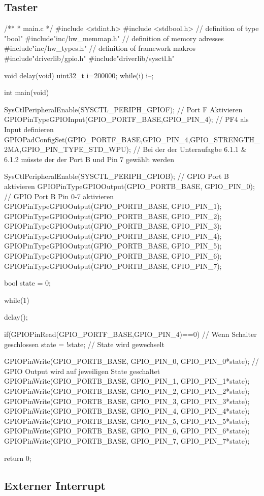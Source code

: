 \subsection{Taster}

/**
 * main.c
 */
 #include <stdint.h>
 #include <stdbool.h>                                           // definition of type "bool"
 #include"inc/hw_memmap.h"                                      // definition of memory adresses
 #include"inc/hw_types.h"                                        // definition of framework makros
 #include"driverlib/gpio.h"
 #include"driverlib/sysctl.h"

void delay(void)
{
  uint32_t i=200000;
  while(i) {i--;}
 }


int main(void){

    SysCtlPeripheralEnable(SYSCTL_PERIPH_GPIOF);                // Port F Aktivieren
    GPIOPinTypeGPIOInput(GPIO_PORTF_BASE,GPIO_PIN_4);           // PF4 als Input definieren
    GPIOPadConfigSet(GPIO_PORTF_BASE,GPIO_PIN_4,GPIO_STRENGTH_2MA,GPIO_PIN_TYPE_STD_WPU);
    // Bei der der Unteraufagbe 6.1.1 & 6.1.2 müsste der der Port B und Pin 7 gewählt werden

    SysCtlPeripheralEnable(SYSCTL_PERIPH_GPIOB);                // GPIO Port B aktivieren
    GPIOPinTypeGPIOOutput(GPIO_PORTB_BASE, GPIO_PIN_0);         // GPIO Port B Pin 0-7 aktivieren
    GPIOPinTypeGPIOOutput(GPIO_PORTB_BASE, GPIO_PIN_1);
    GPIOPinTypeGPIOOutput(GPIO_PORTB_BASE, GPIO_PIN_2);
    GPIOPinTypeGPIOOutput(GPIO_PORTB_BASE, GPIO_PIN_3);
    GPIOPinTypeGPIOOutput(GPIO_PORTB_BASE, GPIO_PIN_4);
    GPIOPinTypeGPIOOutput(GPIO_PORTB_BASE, GPIO_PIN_5);
    GPIOPinTypeGPIOOutput(GPIO_PORTB_BASE, GPIO_PIN_6);
    GPIOPinTypeGPIOOutput(GPIO_PORTB_BASE, GPIO_PIN_7);

    bool state = 0;

   while(1)
   {
       delay();

       if(GPIOPinRead(GPIO_PORTF_BASE,GPIO_PIN_4)==0)               // Wenn Schalter geschlossen
       {
          state = !state;                                           // State wird gewechselt
       }

       GPIOPinWrite(GPIO_PORTB_BASE, GPIO_PIN_0, GPIO_PIN_0*state); // GPIO Output wird auf jeweiligen State geschaltet
       GPIOPinWrite(GPIO_PORTB_BASE, GPIO_PIN_1, GPIO_PIN_1*state);
       GPIOPinWrite(GPIO_PORTB_BASE, GPIO_PIN_2, GPIO_PIN_2*state);
       GPIOPinWrite(GPIO_PORTB_BASE, GPIO_PIN_3, GPIO_PIN_3*state);
       GPIOPinWrite(GPIO_PORTB_BASE, GPIO_PIN_4, GPIO_PIN_4*state);
       GPIOPinWrite(GPIO_PORTB_BASE, GPIO_PIN_5, GPIO_PIN_5*state);
       GPIOPinWrite(GPIO_PORTB_BASE, GPIO_PIN_6, GPIO_PIN_6*state);
       GPIOPinWrite(GPIO_PORTB_BASE, GPIO_PIN_7, GPIO_PIN_7*state);
   }
    return 0;
}

\subsection{Externer Interrupt}
